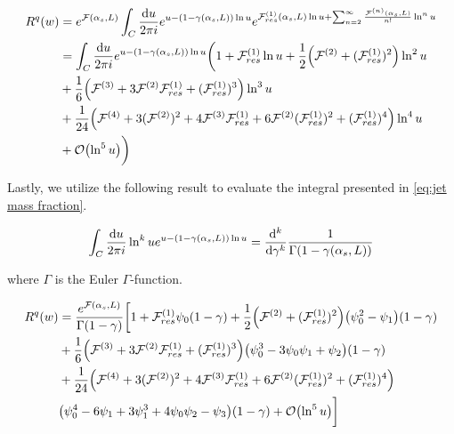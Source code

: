 \documentclass[../main.tex]{subfiles}
\begin{document}
\begin{align}
    \begin{split}
        R^q(w) &= e^{\mathcal{F}(\alpha_s,L)} \int_C \frac{\dd u}{2\pi i} e^{u-(1-\gamma(\alpha_s,L))\ln u} e^{\mathcal{F}^{(1)}_{res}(\alpha_s,L) \ln u +\sum_{n=2}^\infty \frac{\mathcal{F}^{(n)}(\alpha_s,L)}{n!}  \ln^n u}\\
        &= \int_C \frac{\dd u}{2\pi i} e^{u-(1-\gamma(\alpha_s,L))\ln u} \biggl( 1 + \mathcal{F}^{(1)}_{res}\ln u +\frac{1}{2}\qty( \mathcal{F}^{(2)}+(\mathcal{F}^{(1)}_{res})^2)\ln^2 u \\
        &+ \frac{1}{6}\qty(\mathcal{F}^{(3)} + 3 \mathcal{F}^{(2)}\mathcal{F}^{(1)}_{res} + (\mathcal{F}^{(1)}_{res})^3 ) \ln^3 u \\
        &+ \frac{1}{24}\qty(\mathcal{F}^{(4)} + 3(\mathcal{F}^{(2)})^2 + 4 \mathcal{F}^{(3)} \mathcal{F}^{(1)}_{res} + 6 \mathcal{F}^{(2)} (\mathcal{F}^{(1)}_{res})^2 + (\mathcal{F}^{(1)}_{res})^4 )\ln^4 u \\
        &+ \order{\ln^5 u} \biggr)
    \end{split}
\end{align}

Lastly, we utilize the following result to evaluate the integral presented in \cref{eq:jet mass fraction}.

\begin{equation}
    \int_C \frac{\dd u}{2\pi i} \ln^k u e^{u-(1-\gamma(\alpha_s,L))\ln u} = \dv[k]{\gamma} \frac{1}{\Gamma(1-\gamma(\alpha_s,L))}
\end{equation}

where $\Gamma$ is the Euler $\Gamma$-function.

\begin{align}
    \begin{split}\label{eq:Rw quasi final expansion}
        R^q(w) &= \frac{e^{\mathcal{F}(\alpha_s,L)}}{\Gamma(1-\gamma)} \biggl[ 1 + \mathcal{F}^{(1)}_{res} \psi_0(1-\gamma) + \frac{1}{2}\qty( \mathcal{F}^{(2)}+(\mathcal{F}^{(1)}_{res})^2) \qty(\psi_0^2-\psi_1)(1-\gamma) \\
        &+ \frac{1}{6}\qty(\mathcal{F}^{(3)} + 3 \mathcal{F}^{(2)}\mathcal{F}^{(1)}_{res} + (\mathcal{F}^{(1)}_{res})^3 ) \qty(\psi_0^3 -3 \psi_0\psi_1+\psi_2)(1-\gamma) \\
        &+ \frac{1}{24}\qty(\mathcal{F}^{(4)} + 3(\mathcal{F}^{(2)})^2 + 4 \mathcal{F}^{(3)} \mathcal{F}^{(1)}_{res} + 6 \mathcal{F}^{(2)} (\mathcal{F}^{(1)}_{res})^2 + (\mathcal{F}^{(1)}_{res})^4 ) \\
        &\qty(\psi_0^4 -6 \psi_1 + 3\psi_1^3 +4\psi_0\psi_2 -\psi_3)(1-\gamma)+ \order{\ln^5 u} \biggr]
    \end{split}
\end{align}
\end{document}
